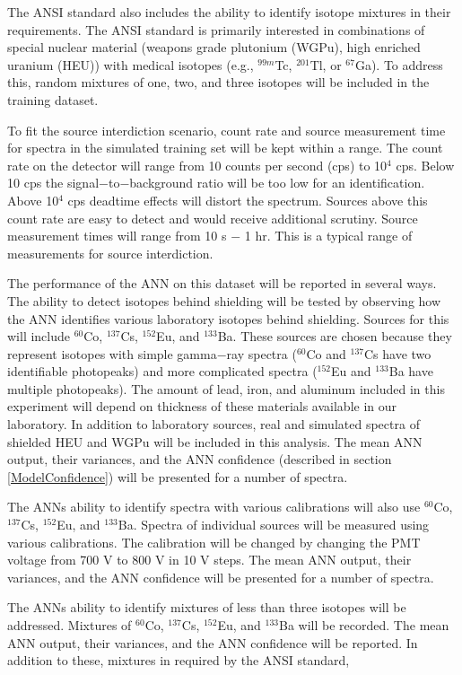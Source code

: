 \documentclass[tocnosub,noragright,centerchapter,12pt,fullpage]{uiucecethesis09}
\begin{document}
The ANSI standard also includes the ability to identify isotope mixtures in their requirements. The ANSI standard is primarily interested in combinations of special nuclear material (weapons grade plutonium (WGPu), high enriched uranium (HEU)) with medical isotopes (e.g., $^{99m}$Tc, $^{201}$Tl, or $^{67}$Ga). To address this, random mixtures of one, two, and three isotopes will be included in the training dataset.

To fit the source interdiction scenario, count rate and source measurement time for spectra in the simulated training set will be kept within a range. The count rate on the detector will range from 10 counts per second (cps) to 10$^{4}$ cps. Below 10 cps the signal$-$to$-$background ratio will be too low for an identification. Above 10$^{4}$ cps deadtime effects will distort the spectrum. Sources above this count rate are easy to detect and would receive additional scrutiny. Source measurement times will range from 10 s $-$ 1 hr. This is a typical range of measurements for source interdiction. 

The performance of the ANN on this dataset will be reported in several ways. The ability to detect isotopes behind shielding will be tested by observing how the ANN identifies various laboratory isotopes behind shielding. Sources for this will include $^{60}$Co, $^{137}$Cs, $^{152}$Eu, and $^{133}$Ba. These sources are chosen because they represent isotopes with simple gamma$-$ray spectra ($^{60}$Co and $^{137}$Cs have two identifiable photopeaks) and more complicated spectra ($^{152}$Eu and $^{133}$Ba have multiple photopeaks). The amount of lead, iron, and aluminum included in this experiment will depend on thickness of these materials available in our laboratory. In addition to laboratory sources, real and simulated spectra of shielded HEU and WGPu will be included in this analysis. The mean ANN output, their variances, and the ANN confidence (described in section \ref{ModelConfidence}) will be presented for a number of spectra. 

The ANNs ability to identify spectra with various calibrations will also use $^{60}$Co, $^{137}$Cs, $^{152}$Eu, and $^{133}$Ba. Spectra of individual sources will be measured using various calibrations. The calibration will be changed by changing the PMT voltage from 700 V to 800 V in 10 V steps. The mean ANN output, their variances, and the ANN confidence will be presented for a number of spectra. 

The ANNs ability to identify mixtures of less than three isotopes will be addressed. Mixtures of $^{60}$Co, $^{137}$Cs, $^{152}$Eu, and $^{133}$Ba will be recorded. The mean ANN output, their variances, and the ANN confidence will be reported. In addition to these, mixtures in required by the ANSI standard, 
\end{document}
